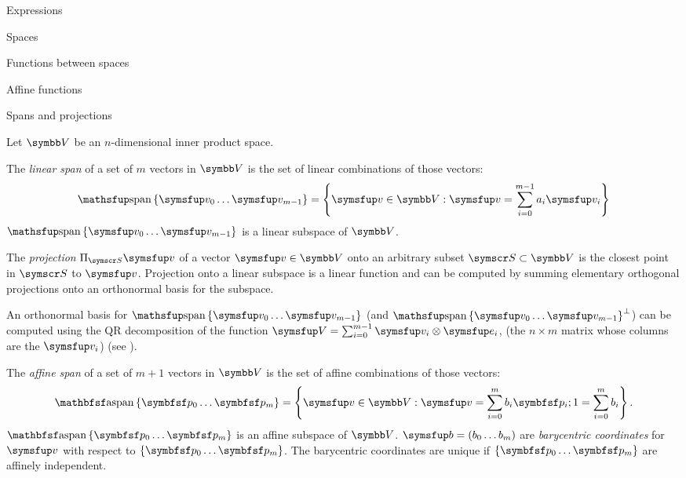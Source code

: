 \documentclass{PalisadesLakesArticle}
\begin{document}
\begin{plSection}{Expressions}
\begin{plSection}{Spaces}
\begin{plSection}{Functions between spaces}
\begin{plSection}{Affine functions}
\end{plSection}%
\begin{plSection}{Spans and projections}
\label{sec:spans-and-projections}

Let $\Space{V}$ be an $n$-dimensional inner product space.

The \textit{linear span} of a set of $m$ vectors in $\Space{V}$
is the set of linear combinations of those vectors:
\begin{equation}
\linearspan\left\{ \Vector{v}_0 \ldots \Vector{v}_{m-1} \right\} = \left\{\Vector{v} \in \Space{V} : \Vector{v} = \sum_{i=0}^{m-1} a_i \Vector{v}_i\right\}
\end{equation}
$\linearspan\left\{ \Vector{v}_0 \ldots \Vector{v}_{m-1} \right\}$ is a linear subspace of $\Space{V}$.

The \textit{projection} $\Projection_{\Set{S}} \Vector{v}$ of a vector $\Vector{v} \in \Space{V}$
onto an arbitrary subset $\Set{S} \subset \Space{V}$
is the closest point in $\Set{S}$ to $\Vector{v}$.
Projection onto a linear subspace is a linear function and
can be computed by summing
elementary orthogonal projections onto an orthonormal basis for the subspace.

An orthonormal basis for $\linearspan\left\{ \Vector{v}_0 \ldots \Vector{v}_{m-1} \right\}$
(and $\linearspan\left\{ \Vector{v}_0 \ldots \Vector{v}_{m-1} \right\}^\perp$)
can be computed using the QR decomposition
of the function $\Vector{V} = \sum_{i=0}^{m-1} \Vector{v}_i \otimes \Vector{e}_i$,
(the $n \times m$ matrix whose columns are the $\Vector{v}_i$)
(see ).

The \textit{affine span} of a set of $m+1$ vectors in $\Space{V}$
is the set of affine combinations of those vectors:
\begin{equation}
\affinespan\left\{ \Point{p}_0 \ldots \Point{p}_{m} \right\} = \left\{\Vector{v} \in \Space{V} : \Vector{v} = \sum_{i=0}^{m} b_i \Point{p}_i;
1 = \sum_{i=0}^{m} b_i \right\}.
\end{equation}
$\affinespan\left\{ \Point{p}_0 \ldots \Point{p}_{m} \right\}$ is an affine subspace of $\Space{V}$.
$\Vector{b} = ( b_0 \ldots b_m )$ are \textit{barycentric coordinates}
for $\Vector{v}$ with respect to $\left\{ \Point{p}_0 \ldots \Point{p}_{m} \right\}$.
The barycentric coordinates are unique if $\left\{ \Point{p}_0 \ldots \Point{p}_{m} \right\}$
are affinely independent.


\end{plSection}
\end{plSection}
\end{plSection}
\end{plSection}
\end{document}

